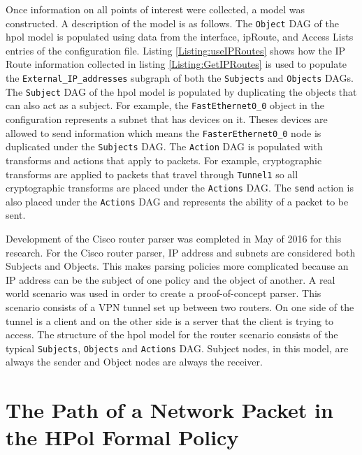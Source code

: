 \documentclass[12pt,letterpaper]{report}
\begin{document}
Once information on all points of interest were collected, a model was constructed. A description of the model is as follows. The \texttt{Object} DAG of the \ac{hpol} model is populated using data from the interface, ipRoute, and Access Lists entries of the configuration file. Listing \ref{Listing:useIPRoutes} shows how the IP Route information collected in listing \ref{Listing:GetIPRoutes} is used to populate the \texttt{External\_IP\_addresses} subgraph of both the \texttt{Subjects} and \texttt{Objects} DAGs. The \texttt{Subject} DAG of the \ac{hpol} model is populated by duplicating the objects that can also act as a subject. For example, the \texttt{FastEthernet0\_0} object in the configuration represents a subnet that has devices on it. Theses devices are allowed to send information which means the \texttt{FasterEthernet0\_0} node is duplicated under the \texttt{Subjects} DAG. The \texttt{Action} DAG is populated with transforms and actions that apply to packets. For example, cryptographic transforms are applied to packets that travel through \texttt{Tunnel1} so all cryptographic transforms are placed under the \texttt{Actions} DAG. The \texttt{send} action is also placed under the \texttt{Actions} DAG and represents the ability of a packet to be sent.




Development of the Cisco router parser was completed in May of 2016 for this research. For the Cisco router parser, IP address and subnets are considered both Subjects and Objects. This makes parsing policies more complicated because an IP address can be the subject of one policy and the object of another. A real world scenario\cite{CiscoVPNExampleWebLink} was used in order to create a proof-of-concept parser. This scenario consists of a VPN tunnel set up between two routers. On one side of the tunnel is a client and on the other side is a server that the client is trying to access. The structure of the \ac{hpol} model for the router scenario consists of the typical \texttt{Subjects}, \texttt{Objects} and \texttt{Actions} DAG. Subject nodes, in this model, are always the sender and Object nodes are always the receiver. %

\section{The Path of a Network Packet in the HPol Formal Policy}
\label{Section:HPolPacketTrace}
\end{document}
